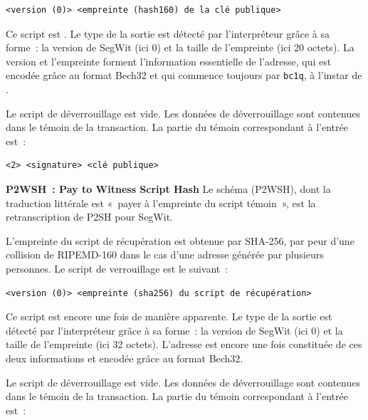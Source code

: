 \begin{Verbatim}[fontsize=\small]
<version (0)> <empreinte (hash160) de la clé publique>
\end{Verbatim}

Ce script est . Le type de la sortie est détecté par l'interpréteur grâce à sa forme~: la version de SegWit (ici 0) et la taille de l'empreinte (ici 20 octets). La version et l'empreinte forment l'information essentielle de l'adresse, qui est encodée grâce au format Bech32 et qui commence toujours par \texttt{bc1q}, à l'instar de .

Le script de déverrouillage est vide. Les données de déverrouillage sont contenues dans le témoin de la transaction. La partie du témoin correspondant à l'entrée est~:

\begin{Verbatim}[fontsize=\small]
<2> <signature> <clé publique>
\end{Verbatim}

\textbf{P2WSH~: Pay to Witness Script Hash} Le schéma  (P2WSH), dont la traduction littérale est «~payer à l'empreinte du script témoin~», est la retranscription de P2SH pour SegWit.

L'empreinte du script de récupération est obtenue par SHA-256, par peur d'une collision de RIPEMD-160 dans le cas d'une adresse générée par plusieurs personnes. Le script de verrouillage est le suivant~:

\begin{Verbatim}[fontsize=\small]
<version (0)> <empreinte (sha256) du script de récupération>
\end{Verbatim}

Ce script est encore une fois  de manière apparente. Le type de la sortie est détecté par l'interpréteur grâce à sa forme~: la version de SegWit (ici 0) et la taille de l'empreinte (ici 32 octets). L'adresse est encore une fois constituée de ces deux informations et encodée grâce au format Bech32.

Le script de déverrouillage est vide. Les données de déverrouillage sont contenues dans le témoin de la transaction. La partie du témoin correspondant à l'entrée est~:


